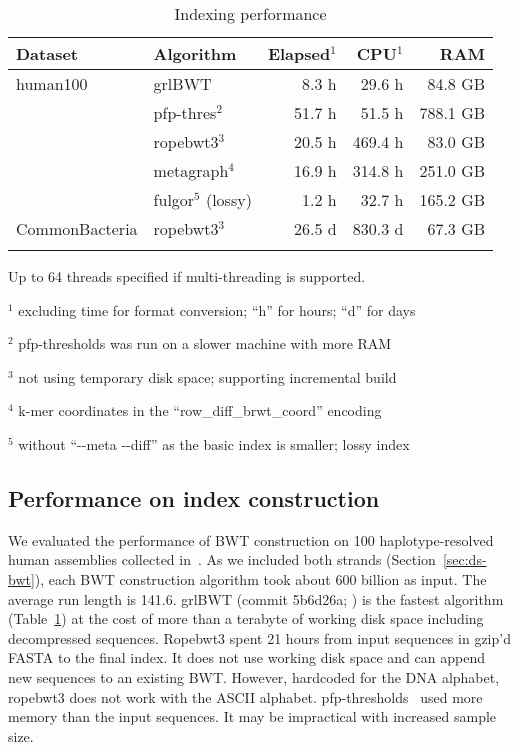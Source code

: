 \documentclass[webpdf,contemporary,large,namedate]{oup-authoring-template}%
\begin{document}
\begin{table}[!tb]
\caption{Indexing performance\label{tab:index}}
\begin{tabular*}{\columnwidth}{@{\extracolsep\fill}llrrr@{\extracolsep\fill}}
\toprule
Dataset        & Algorithm     & Elapsed$^1$ & CPU$^1$  &     RAM \\
\midrule
human100       & grlBWT        &  8.3 h       &  29.6 h &  84.8 GB \\
		       & pfp-thres$^2$ & 51.7 h       &  51.5 h & 788.1 GB \\
               & ropebwt3$^3$  & 20.5 h       & 469.4 h &  83.0 GB \\
			   & metagraph$^4$ & 16.9 h       & 314.8 h & 251.0 GB \\
			   & fulgor$^5$ (lossy)& 1.2 h    &  32.7 h & 165.2 GB \\
CommonBacteria & ropebwt3$^3$  & 26.5 d       & 830.3 d &  67.3 GB \\
\botrule
\end{tabular*}
\begin{tablenotes}\setlength\itemsep{0.0em}
\item Up to 64 threads specified if multi-threading is supported.
\item[$^{1}$] excluding time for format conversion; ``h'' for hours; ``d'' for days
\item[$^{2}$] pfp-thresholds was run on a slower machine with more RAM
\item[$^{3}$] not using temporary disk space; supporting incremental build
\item[$^{4}$] k-mer coordinates in the ``row\_diff\_brwt\_coord'' encoding
\item[$^{5}$] without ``-{}-meta -{}-diff'' as the basic index is smaller; lossy index
\end{tablenotes}
\end{table}

\subsection{Performance on index construction}

We evaluated the performance of BWT construction on 100 haplotype-resolved human assemblies collected in~\citet{Li:2024ab}.
As we included both strands (Section~\ref{sec:ds-bwt}), each BWT construction algorithm took about 600 billion as input.
The average run length is 141.6.
grlBWT (commit 5b6d26a; \citealt*{DBLP:journals/iandc/DiazDominguezN23}) is the fastest algorithm (Table~\ref{tab:index})
at the cost of more than a terabyte of working disk space including decompressed sequences.
Ropebwt3 spent 21 hours from input sequences in gzip'd FASTA to the final index.
It does not use working disk space and can append new sequences to an existing BWT.
However, hardcoded for the DNA alphabet, ropebwt3 does not work with the ASCII alphabet.
pfp-thresholds~\citep{Rossi:2022aa} used more memory than the input sequences.
It may be impractical with increased sample size.
\end{document}
